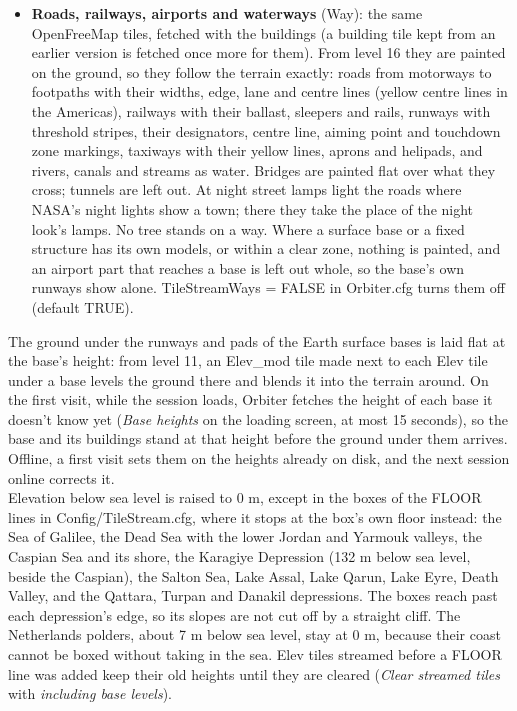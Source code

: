 \documentclass[Orbiter User Manual.tex]{subfiles}
\begin{document}
\begin{itemize}
\item \textbf{Roads, railways, airports and waterways} (Way): the same OpenFreeMap tiles, fetched with the buildings (a building tile kept from an earlier version is fetched once more for them). From level 16 they are painted on the ground, so they follow the terrain exactly: roads from motorways to footpaths with their widths, edge, lane and centre lines (yellow centre lines in the Americas), railways with their ballast, sleepers and rails, runways with threshold stripes, their designators, centre line, aiming point and touchdown zone markings, taxiways with their yellow lines, aprons and helipads, and rivers, canals and streams as water. Bridges are painted flat over what they cross; tunnels are left out. At night street lamps light the roads where NASA's night lights show a town; there they take the place of the night look's lamps. No tree stands on a way. Where a surface base or a fixed structure has its own models, or within a clear zone, nothing is painted, and an airport part that reaches a base is left out whole, so the base's own runways show alone. TileStreamWays = FALSE in Orbiter.cfg turns them off (default TRUE).
\end{itemize}
The ground under the runways and pads of the Earth surface bases is laid flat at the base's height: from level 11, an Elev\_mod tile made next to each Elev tile under a base levels the ground there and blends it into the terrain around. On the first visit, while the session loads, Orbiter fetches the height of each base it doesn't know yet (\textit{Base heights} on the loading screen, at most 15 seconds), so the base and its buildings stand at that height before the ground under them arrives. Offline, a first visit sets them on the heights already on disk, and the next session online corrects it.\\
Elevation below sea level is raised to 0 m, except in the boxes of the FLOOR lines in Config/TileStream.cfg, where it stops at the box's own floor instead: the Sea of Galilee, the Dead Sea with the lower Jordan and Yarmouk valleys, the Caspian Sea and its shore, the Karagiye Depression (132 m below sea level, beside the Caspian), the Salton Sea, Lake Assal, Lake Qarun, Lake Eyre, Death Valley, and the Qattara, Turpan and Danakil depressions. The boxes reach past each depression's edge, so its slopes are not cut off by a straight cliff. The Netherlands polders, about 7 m below sea level, stay at 0 m, because their coast cannot be boxed without taking in the sea. Elev tiles streamed before a FLOOR line was added keep their old heights until they are cleared (\textit{Clear streamed tiles} with \textit{including base levels}).\\
\end{document}
